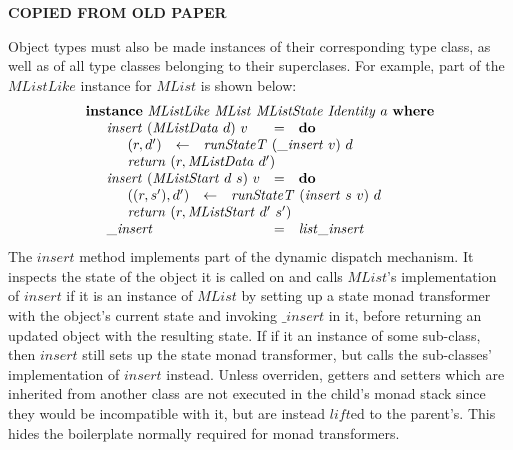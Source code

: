 \textbf{COPIED FROM OLD PAPER}

Object types must also be made instances of their corresponding type class, as well as of all type classes belonging to their superclases. For example, part of the $\mathit{MListLike}$ instance for $\mathit{MList}$ is shown below:
\begin{displaymath}
\begin{array}{l}
\mathbf{instance}~\mathit{MListLike}~\mathit{MList}~\mathit{MListState}~\mathit{Identity}~a~\mathbf{where} \\
\quad \begin{array}{lcl}
\mathit{insert}~(\mathit{MListData}~d)~v & = & \mathbf{do} \\
\multicolumn{3}{l}{\quad \begin{array}{lcl}
    (r,d') & \leftarrow & \mathit{runStateT}~(\_\mathit{insert}~v)~d \\
    \multicolumn{3}{l}{\mathit{return}~(r,\mathit{MListData}~d')}
    \end{array}} \\
\mathit{insert}~(\mathit{MListStart}~d~s)~v & = & \mathbf{do} \\
\multicolumn{3}{l}{\quad \begin{array}{lcl}
    ((r,s'),d') & \leftarrow & \mathit{runStateT}~(\mathit{insert}~s~v)~d \\
    \multicolumn{3}{l}{\mathit{return}~(r,\mathit{MListStart}~d'~s')}
    \end{array}} \\
\_\mathit{insert} & = & \mathit{list}\_\mathit{insert}
\end{array}
\end{array}
\end{displaymath}
The $\mathit{insert}$ method implements part of the dynamic dispatch mechanism. It inspects the state of the object it is called on and calls $\mathit{MList}$'s implementation of $\mathit{insert}$ if it is an instance of $\mathit{MList}$ by setting up a state monad transformer with the object's current state and invoking $\_\mathit{insert}$ in it, before returning an updated object with the resulting state. If if it an instance of some sub-class, then $\mathit{insert}$ still sets up the state monad transformer, but calls the sub-classes' implementation of $\mathit{insert}$ instead. Unless overriden, getters and setters which are inherited from another class are not executed in the child's monad stack since they would be incompatible with it, but are instead $\mathit{lift}$ed to the parent's. This hides the boilerplate normally required for monad transformers.

